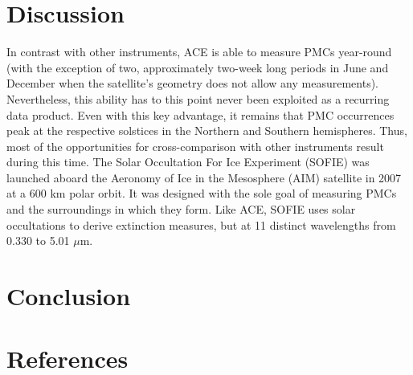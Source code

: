 \documentclass[]{elsarticle}
\begin{document}
\section{Discussion} \label{sec:disc}
In contrast with other instruments, ACE is able to measure PMCs year-round (with the exception of two, approximately two-week long periods in June and December when the satellite's geometry does not allow any measurements). Nevertheless, this ability has to this point never been exploited as a recurring data product. Even with this key advantage, it remains that PMC occurrences peak at the respective solstices in the Northern and Southern hemispheres. Thus, most of the opportunities for cross-comparison with other instruments result during this time. 
The Solar Occultation For Ice Experiment (SOFIE) was launched aboard the Aeronomy of Ice in the Mesosphere (AIM) satellite in 2007 at a 600 km polar orbit. It was designed with the sole goal of measuring PMCs and the surroundings in which they form. Like ACE, SOFIE uses solar occultations to derive extinction measures, but at 11 distinct wavelengths from 0.330 to 5.01 $\mu$m. 

\section{Conclusion} \label{sec:conc}


\section{References}


\end{document}
